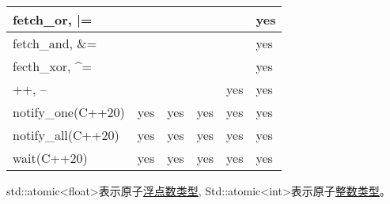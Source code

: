\begin{longtable}[c]{|l|l|l|l|l|l|}
fetch\_or, |=                                            &     &     &     &     & yes \\ \hline
fetch\_and, \&=                                          &     &     &     &     & yes \\ \hline
fecth\_xor, \textasciicircum{}=                          &     &     &     &     & yes \\ \hline
++, --                                                   &     &     &     & yes & yes \\ \hline
notify\_one(C++20)                                       & yes & yes & yes & yes & yes \\ \hline
notify\_all(C++20)                                       & yes & yes & yes & yes & yes \\ \hline
wait(C++20)                                              & yes & yes & yes & yes & yes \\ \hline
\end{longtable}

std::atomic<float>表示原子\href{https://en.cppreference.com/w/cpp/types/is_floating_point}{浮点数类型}, Std::atomic<int>表示原子\href{https://en.cppreference.com/w/cpp/types/is_integral}{整数类型}。













